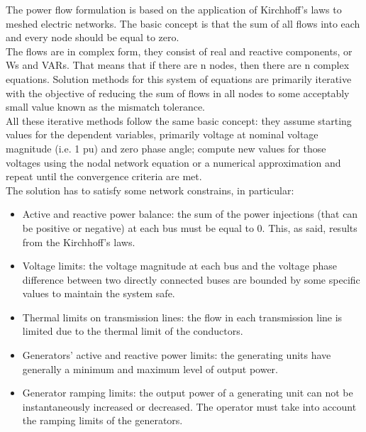 The power flow formulation is based on the application of Kirchhoff’s laws to meshed electric networks. The basic concept is that the sum of all flows into each and every node should be equal to zero.\\
The flows are in complex form, they consist of real and reactive components, or \glspl{W} and \glspl{VAR}. That means that if there are n nodes, then there are n complex equations. 
Solution methods for this system of equations are primarily iterative with the objective of reducing the sum of flows in all nodes to some acceptably small value known as the mismatch tolerance. \\

All these iterative methods follow the same basic concept: they assume starting values for the dependent variables, primarily voltage at nominal voltage magnitude (i.e. 1 \gls{pu}) and zero phase angle; compute new values for those voltages using the nodal network equation or a numerical approximation and repeat until the convergence criteria are met. \\

The solution has to satisfy some network constrains, in particular:
\begin{itemize}
    \item Active and reactive power balance: the sum of the power injections (that can be positive or negative) at each bus must be equal to 0. This, as said, results from the Kirchhoff’s laws.
    
    \item Voltage limits: the voltage magnitude at each bus and the voltage phase difference between two directly connected buses are bounded by some specific values to maintain the system safe.
    
    \item Thermal limits on transmission lines: the flow in each transmission line is limited due to the thermal limit of the conductors.
    
    \item Generators' active and reactive power limits: the generating units have generally a minimum and maximum level of output power.
    
    \item Generator ramping limits: the output power of a generating unit can not be instantaneously increased or decreased. The operator must take into account the ramping limits of the generators.
\end{itemize}

